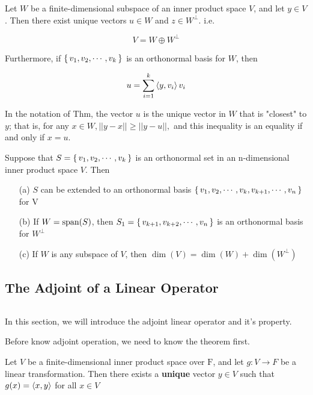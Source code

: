 \begin{thm*}
	Let $W$ be a finite-dimensional subspace of an inner product space $V$, and let $y \in V$. Then there exist unique vectors $u \in W$ and $z \in W^{\perp}$. i.e.
	
	$$V = W \oplus W^{\perp}$$
	
	Furthermore, if $\left\{ \,v_1,v_2,\cdots,v_k \,\right\}$ is an orthonormal basis for $W$, then
	
	$$u = \sum^k_{i=1}\left< y,v_i \right>v_i$$
\end{thm*}

\begin{cor*}
	In the notation of Thm, the vector $u$ is the unique vector in $W$ that is "closest" to $y$; that is, for any $x \in W,||y-x||\geq ||y-u||,$ and this inequality is an equality if and only if $x = u$.
\end{cor*}

\begin{thm*}
	Suppose that $S = \left\{ \,v_1,v_2,\cdots,v_k \,\right\}$ is an orthonormal set in an n-dimensional inner product space $V$. Then
	
	\begin{enumerate}
		\item[(a)] $S$ can be extended to an orthonormal basis $\left\{ \,v_1,v_2,\cdots,v_k,v_{k+1},\cdots,v_n \,\right\}$ for V
		\item[(b)] If $W = \text{span($S$)}$, then $S_1 = \left\{ \,v_{k+1},v_{k+2},\cdots,v_n \,\right\}$ is an orthonormal basis for $W^{\perp}$
		\item[(c)] If $W$ is any subspace of $V$, then $\dim (V) = \dim (W) + \dim (W^{\perp})$
	\end{enumerate}
\end{thm*}

\subsection{The Adjoint of a Linear Operator} $ $

\begin{tcolorbox} 
	In this section, we will introduce the adjoint linear operator and it's property.
	
	Before know adjoint operation, we need to know the theorem first.
\end{tcolorbox}

\begin{thm*}
	Let $V$ be a finite-dimensional inner product space over $\mathrm F$, and let $g: V \rightarrow F$ be a linear transformation. Then there exists a \textbf{unique} vector $y \in V$ such that $g(x) = \left< x,y \right>$ for all $x \in V$
\end{thm*}

